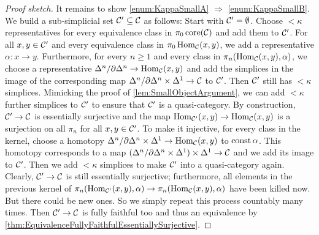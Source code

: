 \begin{proof}[Proof sketch]
	It remains to show \cref{enum:KappaSmallA} $\Rightarrow$ \cref{enum:KappaSmallB}. We build a sub-simplicial set $\mathcal{C}'\subseteq\mathcal{C}$ as follows: Start with $\mathcal{C}'=\emptyset$. Choose $<\kappa$ representatives for every equivalence class in $\pi_0\operatorname{core} (\mathcal{C})$ and add them to $\mathcal{C}'$. For all $x,y\in\mathcal{C}'$ and every equivalence class in $\pi_0\operatorname{Hom}_{\mathcal{C}}(x,y)$, we add a representative $\alpha\colon x\rightarrow y$. Furthermore, for every $n\geqslant 1$ and every class in $\pi_n(\operatorname{Hom}_{\mathcal{C}}(x,y),\alpha)$, we choose a representative $\Delta^n/\partial\Delta^n\rightarrow \operatorname{Hom}_{\mathcal{C}}(x,y)$ and add the simplices in the image of the corresponding map $\Delta^n/\partial\Delta^n\times\Delta^1\rightarrow\mathcal{C}$ to $\mathcal{C}'$. Then $\mathcal{C}'$ still has $<\kappa$ simplices. Mimicking the proof of \cref{lem:SmallObjectArgument}, we can add $<\kappa$ further simplices to $\mathcal{C}'$ to ensure that $\mathcal{C}'$ is a quasi-category. By construction, $\mathcal{C}'\rightarrow\mathcal{C}$ is essentially surjective and the map $\operatorname{Hom}_{\mathcal{C}'}(x,y)\rightarrow\operatorname{Hom}_{\mathcal{C}}(x,y)$ is a surjection on all $\pi_n$ for all $x,y\in\mathcal{C}'$. To make it injective, for every class in the kernel,  choose a homotopy $\Delta^n/\partial\Delta^n\times\Delta^1\rightarrow \operatorname{Hom}_{\mathcal{C}}(x,y)$ to $\operatorname{const}\alpha$. This homotopy corresponds to a map $(\Delta^n/\partial\Delta^n\times\Delta^1)\times\Delta^1\rightarrow \mathcal{C}$ and we add its image to $\mathcal{C}'$. Then we add $<\kappa$ simplices to make $\mathcal{C}'$ into a quasi-category again. Clearly, $\mathcal{C}'\rightarrow\mathcal{C}$ is still essentially surjective; furthermore, all elements in the previous kernel of $\pi_n(\operatorname{Hom}_{\mathcal{C}'}(x,y),\alpha)\rightarrow\pi_n(\operatorname{Hom}_{\mathcal{C}}(x,y),\alpha)$ have been killed now. But there could be new ones. So we simply repeat this process countably many times. Then $\mathcal{C}'\rightarrow \mathcal{C}$ is fully faithful too and thus an equivalence by \cref{thm:EquivalenceFullyFaithfulEssentiallySurjective}.%

\end{proof}
